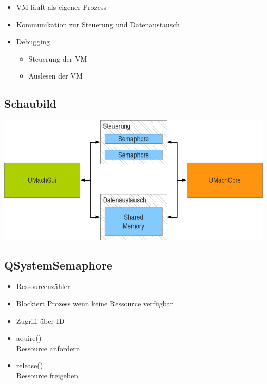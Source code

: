 \begin{frame}{\insertsubsection}
    \begin{itemize}
         \item VM läuft als eigener Prozess
         \item Kommunikation zur Steuerung und Datenaustausch
         \item Debugging
         \begin{itemize}
             \item Steuerung der VM
             \item Auslesen der VM
         \end{itemize}     
    \end{itemize}
\end{frame}

\subsection{Schaubild}

\begin{frame}{\insertsubsection}
    \includegraphics[width=\textwidth]{g1}
\end{frame}

\subsection{QSystemSemaphore}

\begin{frame}{\insertsubsection}
    \begin{itemize}
         \item Ressourcenzähler
         \item Blockiert Prozess wenn keine Ressource verfügbar
         \item Zugriff über ID
         \item aquire()\\
         Ressource anfordern
         \item release()\\
         Ressource freigeben
    \end{itemize}
\end{frame}

